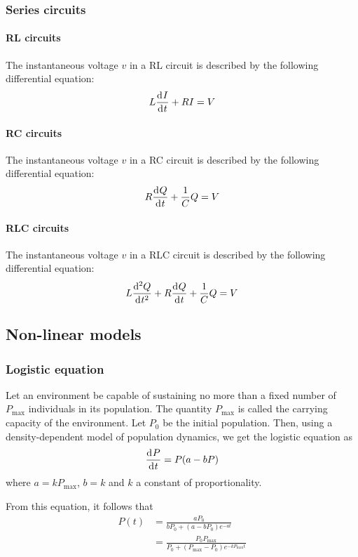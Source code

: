 \documentclass[10pt, twocolumn]{article}
\theoremstyle{definition}
\begin{document}
\subsubsection*{Series circuits}
\paragraph*{RL circuits}
The instantaneous voltage \(v\) in a RL circuit is described by the following differential equation:
\[
  L\frac{\mathrm{d}^{} I}{\mathrm{d}^{} t} + RI = V
\]

\paragraph*{RC circuits}
The instantaneous voltage \(v\) in a RC circuit is described by the following differential equation:
\[
  R \frac{\mathrm{d}^{} Q}{\mathrm{d}^{} t} + \frac{1}{C}Q = V
\]

\paragraph*{RLC circuits}
The instantaneous voltage \(v\) in a RLC circuit is described by the following differential equation:
\[
  L \frac{\mathrm{d}^{2} Q}{\mathrm{d}^{} t^{2}} + R \frac{\mathrm{d}^{} Q}{\mathrm{d}^{} t} + \frac{1}{C}Q = V
\]


\subsection{Non-linear models}
\subsubsection*{Logistic equation}
Let an environment be capable of sustaining no more than a fixed number of \(P_\mathrm{max}\) individuals in its population.
The quantity \(P_\mathrm{max}\) is called the carrying capacity of the environment.
Let \(P_0 \) be the initial population.
Then, using a density-dependent model of population dynamics, we get the logistic equation as
\[
  \frac{\mathrm{d}^{} P}{\mathrm{d}^{} t} = P(a - bP)
\]
where \(a = kP_\mathrm{max}\), \(b = k\) and \(k\) a constant of proportionality.

From this equation, it follows that
\begin{align*}
  P(t) & = \frac{aP_0 }{bP_0 + (a - bP_0 )e^{-at}}                                       \\
       & = \frac{P_0 P_\mathrm{max}}{P_0 + (P_\mathrm{max} - P_0 )e^{-kP_\mathrm{max}t}}
\end{align*}
\end{document}
